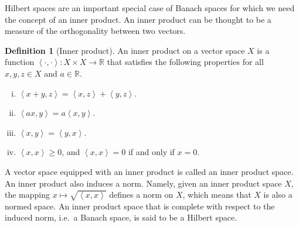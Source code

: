 \documentclass[english, 12pt, a4paper, sci, utf8, a-2b, online]{aaltothesis}
\theoremstyle{definition}
\newtheorem{definition}{Definition}[section]
\theoremstyle{plain}
\newcommand*{\innerprod}[2]{\left\langle #1, #2 \right\rangle}
\numberwithin{equation}{section}
\begin{document}
Hilbert spaces are an important special case of Banach spaces
for which we need the concept of an inner product.
An inner product can be thought to be a measure of the orthogonality
between two vectors.
\begin{definition}[Inner product]
    \label{def:innerproduct}
    An inner product on a vector space $X$ is a function
    $\innerprod{\cdot}{\cdot}: X \times X \to \mathbb{R}$
    that satisfies the following properties for all $x,y,z \in X$
    and $a \in \mathbb{R}$.
    \begin{enumerate}[(i)]
        \item $\innerprod{x+y}{z}=\innerprod{x}{z} + \innerprod{y}{z}$.
        \item $\innerprod{ax}{y} = a\innerprod{x}{y}$.
        \item $\innerprod{x}{y} = \innerprod{y}{x}$.
        \item $\innerprod{x}{x} \geq 0$, and $\innerprod{x}{x}=0$
        if and only if $x=0$.
    \end{enumerate}
\end{definition}
A vector space equipped with an inner product is called an inner product space.
An inner product also induces a norm. Namely, given an inner product space $X$,
the mapping $x \mapsto \sqrt{\innerprod{x}{x}}$ defines a norm on $X$,
which means that $X$ is also a normed space.
An inner product space that is complete with respect to the induced norm,
i.e.\ a Banach space, is said to be a Hilbert space.
\end{document}
